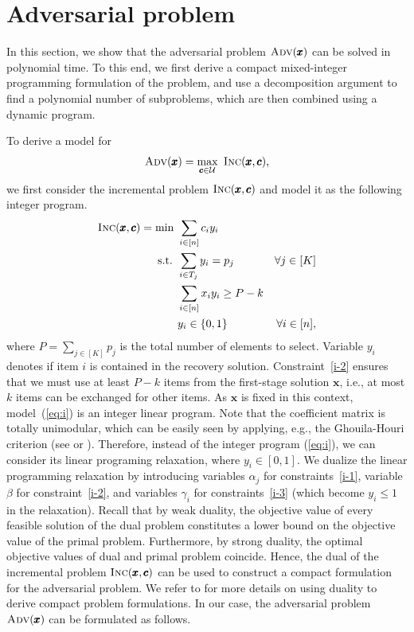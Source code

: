 \section{Adversarial problem}
\label{sec:adv}

In this section, we show that the adversarial problem $\textsc{Adv}(\pmb{x})$ can be solved in polynomial time. To this end, we first derive a compact mixed-integer programming formulation of the problem, and use a decomposition argument to find a polynomial number of subproblems, which are then combined using a dynamic program.

To derive a model for 
\[ \textsc{Adv}(\pmb{x}) = \max_{\pmb{c}\in\cU}\ \textsc{Inc}(\pmb{x},\pmb{c}), \]
we first consider the incremental problem {$\textsc{Inc}(\pmb{x},\pmb{c})$} and model it as the following integer program.
\begin{subequations}
\label{eq:i}  
\begin{align}
\textsc{Inc}(\pmb{x},\pmb{c}) = \min\ & \sum_{i\in[n]} c_i y_i \label{i-0} \\
\text{s.t. } & \sum_{i\in T_j} y_i = p_j  & \forall j\in[K] \label{i-1}\\
& \sum_{i\in[n]} x_i y_i \ge P-k \label{i-2}\\
& y_i\in\{0,1\} & \forall i\in[n], \label{i-3}
\end{align}
\end{subequations}
where $P = \sum_{j \in [K]} p_j$ is the total number of elements to select. Variable $y_i$ denotes if item $i$ is contained in the recovery solution. Constraint~\eqref{i-2} ensures that we must use at least $P-k$ items from the first-stage solution $\pmb{x}$, i.e., at most $k$ items can be exchanged for other items. As $\pmb{x}$ is fixed in this context, model~(\ref{eq:i}) is an integer linear program. Note that the coefficient matrix is totally unimodular, which can be easily seen by applying, e.g., the Ghouila-Houri criterion (see \cite{GH62} or \cite[Theorem 5.23]{korte2006combinatorial}). Therefore, instead of the integer program (\ref{eq:i}), we can consider its linear programing relaxation, where $y_i \in [0,1]$. We dualize the linear programming relaxation by introducing variables $\alpha_j$ for constraints~\eqref{i-1}, variable $\beta$ for constraint~\eqref{i-2}, and variables $\gamma_i$ for constraints~\eqref{i-3} (which become $y_i \le 1$ in the relaxation). Recall that by weak duality, the objective value of every feasible solution of the dual problem constitutes a lower bound on the objective value of the primal problem. Furthermore, by strong duality, the optimal objective values of dual and primal problem coincide. Hence, the dual of the incremental problem $\textsc{Inc}(\pmb{x},\pmb{c})$ can be used to construct a compact formulation for the adversarial problem.  We refer to \cite{gorissen2015practical} for more details on using duality to derive compact problem formulations. In our case, the adversarial problem $\textsc{Adv}(\pmb{x})$ can be formulated as follows.
